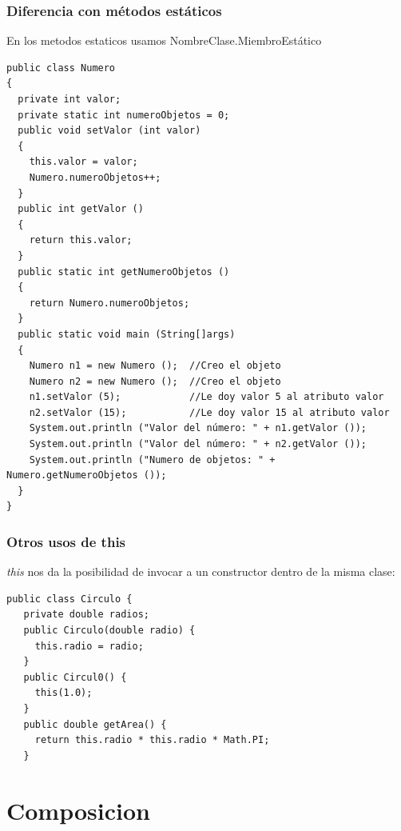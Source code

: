 \documentclass{beamer}
\begin{document}
\begin{frame}[fragile]
\frametitle{Diferencia con métodos estáticos}
En los metodos estaticos usamos \alert{NombreClase}.\alert{MiembroEstático}
\begin{tiny}
\begin{verbatim}
public class Numero
{
  private int valor;
  private static int numeroObjetos = 0;
  public void setValor (int valor)
  {
    this.valor = valor;
    Numero.numeroObjetos++;
  }
  public int getValor ()
  {
    return this.valor;
  }
  public static int getNumeroObjetos ()
  {
    return Numero.numeroObjetos;
  }
  public static void main (String[]args)
  {
    Numero n1 = new Numero ();  //Creo el objeto
    Numero n2 = new Numero ();  //Creo el objeto
    n1.setValor (5);            //Le doy valor 5 al atributo valor
    n2.setValor (15);           //Le doy valor 15 al atributo valor
    System.out.println ("Valor del número: " + n1.getValor ());
    System.out.println ("Valor del número: " + n2.getValor ());
    System.out.println ("Numero de objetos: " + Numero.getNumeroObjetos ());
  }
}
\end{verbatim}
\end{tiny}
\end{frame}




\begin{frame}[fragile]
    \frametitle{Otros usos de this}
    \emph{this} nos da la posibilidad de invocar a un constructor dentro de la misma clase:
   \begin{verbatim}
public class Circulo {
   private double radios;
   public Circulo(double radio) {
     this.radio = radio;
   }
   public Circul0() {
     this(1.0);
   }
   public double getArea() {
     return this.radio * this.radio * Math.PI;
   }
\end{verbatim} 
\end{frame}


\section{Composicion}
\end{document}
